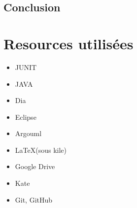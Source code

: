 \documentclass[a4paper,twoside,12pt]{report}
\begin{document}
\section{Conclusion}
%
\newpage
{}


\chapter{Resources utilisées}
\begin{itemize}
 \item JUNIT
 \item JAVA
 \item Dia
 \item Eclipse
 \item Argouml
 \item \LaTeX (sous kile)
 \item Google Drive
 \item Kate
 \item Git, GitHub
\end{itemize}
\end{document}
